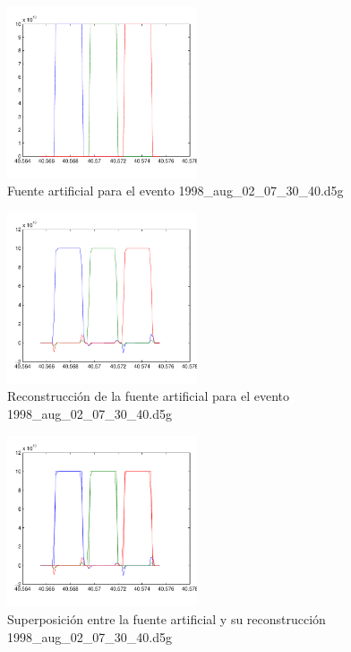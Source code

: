 \begin{figure}[H]
\centering
\includegraphics[width=0.5\textwidth,height=0.4\textheight]{linea_timerev/figuras/testRec/artsrc.pdf}
\caption{Fuente artificial para el evento 1998\_aug\_02\_07\_30\_40.d5g}
\end{figure}

\begin{figure}[H]
\centering
\includegraphics[width=0.5\textwidth,height=0.4\textheight]{linea_timerev/figuras/testRec/recartsrc.pdf}
\caption{Reconstrucción de la fuente artificial para el evento
1998\_aug\_02\_07\_30\_40.d5g}
\end{figure}

\begin{figure}[H]
\centering
\includegraphics[width=0.5\textwidth,height=0.4\textheight]{linea_timerev/figuras/testRec/bothtestsrc.pdf}
\caption{Superposición entre la fuente artificial y su reconstrucción
1998\_aug\_02\_07\_30\_40.d5g}
\end{figure}


